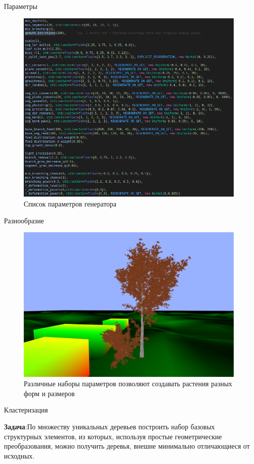 \documentclass[11pt]{beamer}
\begin{document}
\begin{frame}{Параметры}
\begin{figure}[hbtp]
\includegraphics[scale=0.275]{parameters.png}
\caption{Список параметров генератора}
\end{figure}
\end{frame}
\begin{frame}{Разнообразие}
\begin{figure}[hbtp]
\includegraphics[scale=0.215]{div.png}
\caption{Различные наборы параметров позволяют создавать растения разных форм и размеров}
\end{figure}
\end{frame}
\begin{frame}{Кластеризация}

\textbf{Задача}:\linebreak По множеству уникальных деревьев построить набор базовых структурных элементов, из которых, используя простые геометрические преобразования, можно получить деревья, внешне минимально отличающиеся от исходных.
\end{frame}
\end{document}
